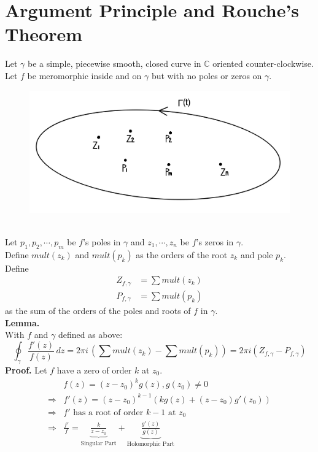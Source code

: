 \documentclass[11pt]{article}
\begin{document}
\section{Argument Principle and Rouche's Theorem}
Let $\gamma$ be a simple, piecewise smooth, closed curve in $\mathbb{C}$ oriented counter-clockwise. Let $f$ be meromorphic inside and on $\gamma$ but with no poles or zeros on $\gamma$.
\begin{figure}[h]
\includegraphics[scale=0.15]{22_1} 
\centering
\end{figure} 
\\
Let $p_1, p_2, \cdots, p_m$ be $f$'s poles in $\gamma$ and $z_1, \cdots, z_n$ be $f$'s zeros in $\gamma$. \\
Define $mult(z_k)$ and $mult(p_k)$ as the orders of the root $z_k$ and pole $p_k$. \\
Define 
\begin{align*}
Z_{f, \gamma} &= \sum mult(z_k) \\
P_{f, \gamma} &= \sum mult(p_k) 
\end{align*}
as the sum of the orders of the poles and roots of $f$ in $\gamma$. \\
\newline
\textbf{Lemma.} \\
With $f$ and $\gamma$ defined as above:
$$ \oint_{\gamma}\frac{f'(z)}{f(z)}\, dz = 2\pi i\,\left(\sum mult(z_k) - \sum mult(p_k)\right) = 2\pi i (Z_{f, \gamma} - P_{f, \gamma}) $$
\textbf{Proof.} Let $f$ have a zero of order $k$ at $z_0$. \\
\begin{align*}
&f(z) = (z - z_0)^kg(z), g(z_0) \neq 0 \\ 
\Rightarrow &f'(z) = (z - z_0)^{k - 1}\left(kg(z) + (z - z_0)g'(z_0)\right) \\ 
\Rightarrow & f' \text{ has a root of order } k - 1 \text{ at } z_0 \\
\Rightarrow & \frac{f'}{f} = \underbrace{\frac{k}{z - z_0}}_{\text{Singular Part}} + \underbrace{\frac{g'(z)}{g(z)}}_{\text{Holomorphic Part}}
\end{align*} 
\end{document}
